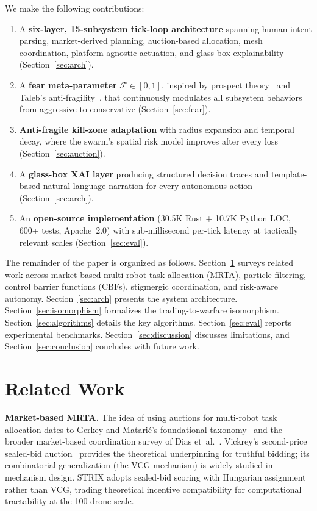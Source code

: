 \documentclass[conference]{IEEEtran}
\newcommand{\fear}{\mathcal{F}}
\begin{document}
We make the following contributions:
\begin{enumerate}
  \item A \textbf{six-layer, 15-subsystem tick-loop architecture}
    spanning human intent parsing, market-derived planning, auction-based
    allocation, mesh coordination, platform-agnostic actuation, and
    glass-box explainability (Section~\ref{sec:arch}).
  \item A \textbf{fear meta-parameter} $\fear\in[0,1]$, inspired by
    prospect theory~\cite{kahneman1979prospect} and Taleb's
    anti-fragility~\cite{taleb2012antifragile}, that continuously
    modulates all subsystem behaviors from aggressive to conservative
    (Section~\ref{sec:fear}).
  \item \textbf{Anti-fragile kill-zone adaptation} with radius
    expansion and temporal decay, where the swarm's spatial risk model
    improves after every loss (Section~\ref{sec:auction}).
  \item A \textbf{glass-box XAI layer} producing structured decision
    traces and template-based natural-language narration for every
    autonomous action (Section~\ref{sec:arch}).
  \item An \textbf{open-source implementation} (30.5K Rust + 10.7K
    Python LOC, 600{+} tests, Apache~2.0) with sub-millisecond
    per-tick latency at tactically relevant scales
    (Section~\ref{sec:eval}).
\end{enumerate}

The remainder of the paper is organized as follows.
Section~\ref{sec:related} surveys related work across market-based
multi-robot task allocation (MRTA), particle filtering, control
barrier functions (CBFs), stigmergic coordination, and risk-aware
autonomy.  Section~\ref{sec:arch} presents the system architecture.
Section~\ref{sec:isomorphism} formalizes the trading-to-warfare
isomorphism.  Section~\ref{sec:algorithms} details the key algorithms.
Section~\ref{sec:eval} reports experimental benchmarks.
Section~\ref{sec:discussion} discusses limitations, and
Section~\ref{sec:conclusion} concludes with future work.

\section{Related Work}
\label{sec:related}

\textbf{Market-based MRTA.}\quad
The idea of using auctions for multi-robot task allocation dates to
Gerkey and Matari\'c's foundational taxonomy~\cite{gerkey2002sold} and
the broader market-based coordination survey of Dias
et~al.~\cite{dias2006market}.  Vickrey's second-price sealed-bid
auction~\cite{vickrey1961counterspeculation} provides the theoretical
underpinning for truthful bidding; its combinatorial generalization
(the VCG mechanism) is widely studied in mechanism design.  STRIX
adopts sealed-bid scoring with Hungarian assignment~\cite{kuhn1955hungarian}
rather than VCG, trading theoretical incentive compatibility for
computational tractability at the 100-drone scale.
\end{document}
